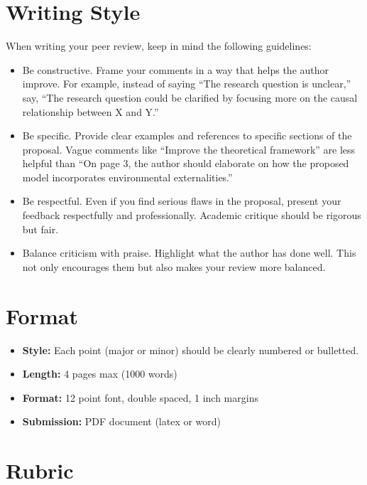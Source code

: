\documentclass[
]{article}
\begin{document}
\hypertarget{writing-style}{%
\section{Writing Style}\label{writing-style}}

When writing your peer review, keep in mind the following guidelines:

\begin{itemize}
\item
  Be constructive. Frame your comments in a way that helps the author improve. For example, instead of saying ``The research question is unclear,'' say, ``The research question could be clarified by focusing more on the causal relationship between X and Y.''
\item
  Be specific. Provide clear examples and references to specific sections of the proposal. Vague comments like ``Improve the theoretical framework'' are less helpful than ``On page 3, the author should elaborate on how the proposed model incorporates environmental externalities.''
\item
  Be respectful. Even if you find serious flaws in the proposal, present your feedback respectfully and professionally. Academic critique should be rigorous but fair.
\item
  Balance criticism with praise. Highlight what the author has done well. This not only encourages them but also makes your review more balanced.
\end{itemize}

\hypertarget{format}{%
\section{Format}\label{format}}

\begin{itemize}
\item
  \textbf{Style:} Each point (major or minor) should be clearly numbered or bulletted.
\item
  \textbf{Length:} 4 pages max (1000 words)
\item
  \textbf{Format:} 12 point font, double spaced, 1 inch margins
\item
  \textbf{Submission:} PDF document (latex or word)
\end{itemize}

\newpage

\hypertarget{rubric}{%
\section{Rubric}\label{rubric}}
\end{document}
